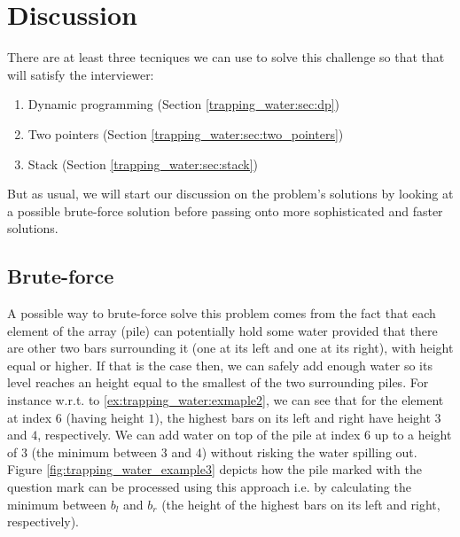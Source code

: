 %
%	

\section{Discussion}
\label{trapping_water:sec:discussion}
There are at least three tecniques we can use to  solve this challenge so that that will satisfy the interviewer:
\begin{enumerate}
	\item Dynamic programming (Section \ref{trapping_water:sec:dp})
	\item Two pointers (Section \ref{trapping_water:sec:two_pointers})
	\item Stack (Section \ref{trapping_water:sec:stack})
\end{enumerate}
But as usual, we will start our discussion on the problem's solutions by looking at a possible brute-force solution before  passing onto more sophisticated and faster solutions.

\subsection{Brute-force}
\label{trapping_water:sec:bruteforce}

A possible way to brute-force  solve this problem comes from the fact that each element of the array (pile) can potentially hold some water provided that there are other two bars surrounding it (one at its left and one at its right), with height equal or higher.
If that is the case then, we can safely add enough water so its level reaches an height equal to the smallest of the two surrounding piles.
For instance w.r.t. to \ref{ex:trapping_water:exmaple2}, we can see that for the element at index $6$ (having height $1$), the highest bars on its left and right have height $3$ and $4$, respectively. 
We can add water on top of the pile at index $6$ up to a height of $3$ (the minimum between $3$ and $4$) without risking the water spilling out.
Figure \ref{fig:trapping_water_example3} depicts how the pile marked with the question mark can be processed using this approach i.e. by calculating the minimum between $b_l$ and $b_r$ (the height of the highest bars on its left and right, respectively).

